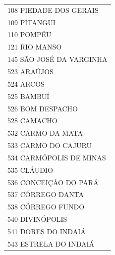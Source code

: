 \documentclass{article}
\begin{document}
\begin{longtable}[c]{m{18cm}}
\multicolumn{1}{l}{ \hspace{2em} 108 PIEDADE DOS GERAIS } \\
\multicolumn{1}{l}{ \hspace{2em} 109 PITANGUI } \\
\multicolumn{1}{l}{ \hspace{2em} 110 POMPÉU } \\
\multicolumn{1}{l}{ \hspace{2em} 121 RIO MANSO } \\
\multicolumn{1}{l}{ \hspace{2em} 145 SÃO JOSÉ DA VARGINHA } \\
\multicolumn{1}{l}{ \hspace{2em} 523 ARAÚJOS } \\
\multicolumn{1}{l}{ \hspace{2em} 524 ARCOS } \\
\multicolumn{1}{l}{ \hspace{2em} 525 BAMBUÍ } \\
\multicolumn{1}{l}{ \hspace{2em} 526 BOM DESPACHO } \\
\multicolumn{1}{l}{ \hspace{2em} 528 CAMACHO } \\
\multicolumn{1}{l}{ \hspace{2em} 532 CARMO DA MATA } \\
\multicolumn{1}{l}{ \hspace{2em} 533 CARMO DO CAJURU } \\
\multicolumn{1}{l}{ \hspace{2em} 534 CARMÓPOLIS DE MINAS } \\
\multicolumn{1}{l}{ \hspace{2em} 535 CLÁUDIO } \\
\multicolumn{1}{l}{ \hspace{2em} 536 CONCEIÇÃO DO PARÁ } \\
\multicolumn{1}{l}{ \hspace{2em} 537 CÓRREGO DANTA } \\
\multicolumn{1}{l}{ \hspace{2em} 538 CÓRREGO FUNDO } \\
\multicolumn{1}{l}{ \hspace{2em} 540 DIVINÓPOLIS } \\
\multicolumn{1}{l}{ \hspace{2em} 541 DORES DO INDAIÁ } \\
\multicolumn{1}{l}{ \hspace{2em} 543 ESTRELA DO INDAIÁ } \\

\end{longtable}
\end{document}
